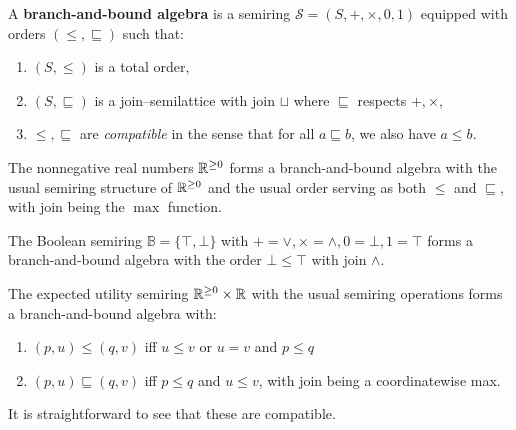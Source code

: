 \documentclass[acmsmall,review]{acmart}\settopmatter{printfolios=true,printccs=false,printacmref=false}
\begin{document}
\begin{definition}
  A \textbf{branch-and-bound algebra} is a semiring $\mathcal S = (S, + , \times, 0 ,1)$ equipped with orders $(\leq, \sqsubseteq)$ such that:
  \begin{enumerate}
    \item $(S, \leq)$ is a total order,
    \item $(S, \sqsubseteq)$ is a join--semilattice with join $\sqcup$ where $\sqsubseteq$ respects $+,\times$, 
    \item $\leq, \sqsubseteq$ are \textit{compatible} in the sense that for all $a \sqsubseteq b$, we also have $a \leq b$.
  \end{enumerate}
\end{definition}

\begin{example}
  The nonnegative real numbers $\mathbb{R}^{\geq 0}$ forms a branch-and-bound algebra with the usual semiring structure of $\mathbb{R}^{\geq 0}$ and the usual order serving as both $\leq$ and $\sqsubseteq$, with join being the $\max$ function.
\end{example}

\begin{example}
  The Boolean semiring $\mathbb B = \{\top, \bot\}$ with $+ = \lor, \times = \land, 0 = \bot, 1 = \top$ forms a branch-and-bound algebra with the order $\bot \leq \top$ with join $\land$. 
\end{example}


\begin{example}
  The expected utility semiring $\mathbb{R}^{\geq 0} \times \mathbb{R}$ with the usual semiring operations forms a branch-and-bound algebra with:
  \begin{enumerate}
    \item $(p,u) \leq (q,v)$ iff $u \leq v$ or $u=v$ and $p \leq q$ 
    \item $(p,u) \sqsubseteq (q,v)$ iff $p \leq q$ and $u \leq v$, with join being a coordinatewise max.
  \end{enumerate} 
  It is straightforward to see that these are compatible.
\end{example}
\end{document}
